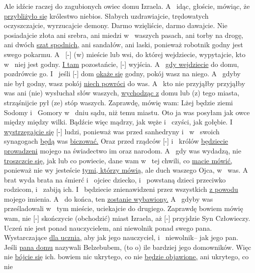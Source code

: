  Ale idźcie raczej do zagubionych owiec domu Izraela.
 A~ idąc, głoście, mówiąc, że \underline{przybliżyło się} królestwo niebios.
 Słabych uzdrawiajcie, trędowatych oczyszczajcie, wyrzucajcie demony. Darmo wzięliście, darmo dawajcie.
 Nie posiadajcie złota ani srebra, ani miedzi w~ waszych pasach,
 ani torby na drogę, ani dwóch \underline{szat spodnich,} ani sandałów, ani laski, ponieważ robotnik godny jest swego pokarmu.
 A~ [-] (w) mieście lub wsi, do której wejdziecie, wypytajcie, kto w~ niej jest godny. \underline{I tam} pozostańcie,  [-] wyjścia.
 A~ \underline{gdy wejdziecie} do domu, pozdrówcie go.
 I~ jeśli [-] dom \underline{okaże się} godny,  pokój wasz na niego. A~ gdyby nie był godny, wasz pokój \underline{niech powróci} do was.
 A~ kto nie przyjąłby przyjąłby was ani (nie) wysłuchał słów waszych, \underline{wychodząc z} domu lub (z) tego miasta, strząśnijcie pył (ze) stóp waszych.
 Zaprawdę, mówię wam: Lżej będzie ziemi Sodomy i~ Gomory w~ dniu sądu, niż temu miastu.
 Oto ja was posyłam jak owce między między wilki. Bądźcie więc mądrzy, jak węże i~ czyści, jak gołębie.
 I~ \underline{wystrzegajcie się} [-] ludzi, ponieważ  was przed sanhedryny i~ w~ swoich synagogach \underline{będą} was \underline{biczować.}
 Oraz przed rządców [-] i~ królów \underline{będziecie prowadzeni}  mojego  na świadectwo im oraz narodom.
 A~ gdy was wydadzą, nie \underline{troszczcie się,} jak lub co powiecie,  dane wam w~ tej chwili, co \underline{macie mówić,}
 ponieważ nie wy jesteście \underline{tymi, którzy mówią,} ale duch waszego Ojca,  w~ was.
 A~ brat wyda brata na śmierć i~ ojciec dziecko, i~ powstaną dzieci przeciwko rodzicom, i~ zabiją ich.
 I~ będziecie znienawidzeni przez wszystkich \underline{z powodu} mojego imienia. A~  do końca, ten \underline{zostanie wybawiony.}
 A~ gdyby was prześladowali w~ tym mieście, uciekajcie do drugiego. Zaprawdę bowiem mówię wam, nie [-] skończycie (obchodzić) miast Izraela, aż [-] przyjdzie Syn Człowieczy.
 Uczeń nie jest ponad nauczycielem, ani niewolnik ponad swego pana.
 Wystarczające \underline{dla ucznia,} aby  jak jego nauczyciel, i~ niewolnik– jak jego pan. Jeśli \underline{pana domu} nazywali Belzebubem, (to o) ile bardziej jego domowników.
 Więc nie \underline{bójcie się} ich.  bowiem nic ukrytego, co nie \underline{będzie objawione,} ani ukrytego, co nie 
